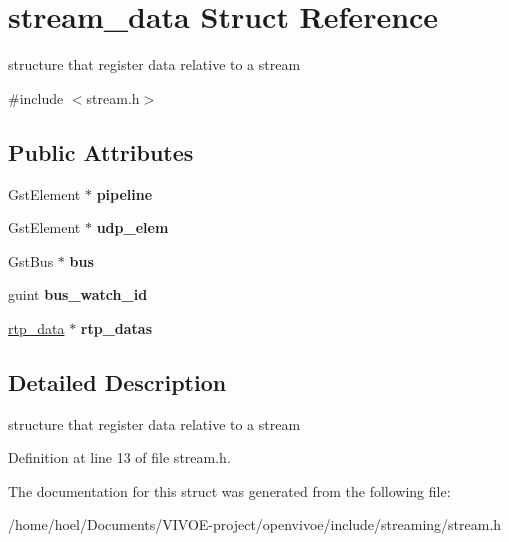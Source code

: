 \hypertarget{structstream__data}{}\section{stream\+\_\+data Struct Reference}
\label{structstream__data}


structure that register data relative to a stream  




{\ttfamily \#include $<$stream.\+h$>$}

\subsection*{Public Attributes}
\begin{DoxyCompactItemize}
\item 
Gst\+Element $\ast$ {\bfseries pipeline}\hypertarget{structstream__data_a5fa957ae1033cda04fb95af52b07a15d}{}\label{structstream__data_a5fa957ae1033cda04fb95af52b07a15d}

\item 
Gst\+Element $\ast$ {\bfseries udp\+\_\+elem}\hypertarget{structstream__data_af40d82b4e3591b65a196bf666f7d0a9f}{}\label{structstream__data_af40d82b4e3591b65a196bf666f7d0a9f}

\item 
Gst\+Bus $\ast$ {\bfseries bus}\hypertarget{structstream__data_a39a9a3568d87ee82a05102165d362eb5}{}\label{structstream__data_a39a9a3568d87ee82a05102165d362eb5}

\item 
guint {\bfseries bus\+\_\+watch\+\_\+id}\hypertarget{structstream__data_aa021d756f15c8de22986f5c351dd9422}{}\label{structstream__data_aa021d756f15c8de22986f5c351dd9422}

\item 
\hyperlink{structrtp__data}{rtp\+\_\+data} $\ast$ {\bfseries rtp\+\_\+datas}\hypertarget{structstream__data_ab6ac792ba465396a4dc205fa50fd52cd}{}\label{structstream__data_ab6ac792ba465396a4dc205fa50fd52cd}

\end{DoxyCompactItemize}


\subsection{Detailed Description}
structure that register data relative to a stream 

Definition at line 13 of file stream.\+h.



The documentation for this struct was generated from the following file\+:\begin{DoxyCompactItemize}
\item 
/home/hoel/\+Documents/\+V\+I\+V\+O\+E-\/project/openvivoe/include/streaming/stream.\+h\end{DoxyCompactItemize}
